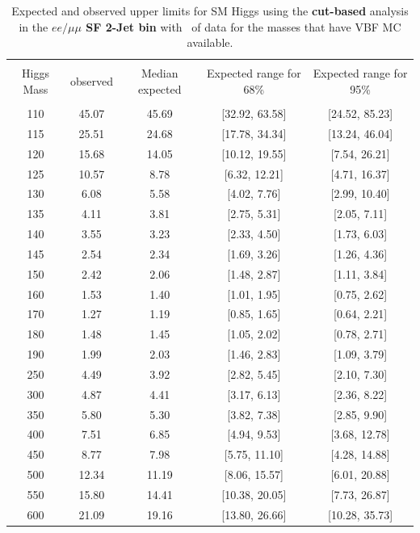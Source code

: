 \begin{table}[hbp!]
\begin{center}
\begin{tabular}{c c c c c}
\hline
\vspace{-3mm} && \\
 Higgs Mass & observed  & Median expected & Expected range for 68\% & Expected range for 95\%   \\
\vspace{-3mm} && \\
\hline
110 & 45.07 & 45.69 & [32.92, 63.58] & [24.52, 85.23] \\
115 & 25.51 & 24.68 & [17.78, 34.34] & [13.24, 46.04] \\
120 & 15.68 & 14.05 & [10.12, 19.55] & [7.54, 26.21] \\
125 & 10.57 & 8.78 & [6.32, 12.21] & [4.71, 16.37] \\
130 & 6.08 & 5.58 & [4.02, 7.76] & [2.99, 10.40] \\
135 & 4.11 & 3.81 & [2.75, 5.31] & [2.05, 7.11] \\
140 & 3.55 & 3.23 & [2.33, 4.50] & [1.73, 6.03] \\
145 & 2.54 & 2.34 & [1.69, 3.26] & [1.26, 4.36] \\
150 & 2.42 & 2.06 & [1.48, 2.87] & [1.11, 3.84] \\
160 & 1.53 & 1.40 & [1.01, 1.95] & [0.75, 2.62] \\
170 & 1.27 & 1.19 & [0.85, 1.65] & [0.64, 2.21] \\
180 & 1.48 & 1.45 & [1.05, 2.02] & [0.78, 2.71] \\
190 & 1.99 & 2.03 & [1.46, 2.83] & [1.09, 3.79] \\

250 & 4.49 & 3.92 & [2.82, 5.45] & [2.10, 7.30] \\
300 & 4.87 & 4.41 & [3.17, 6.13] & [2.36, 8.22] \\
350 & 5.80 & 5.30 & [3.82, 7.38] & [2.85, 9.90] \\
400 & 7.51 & 6.85 & [4.94, 9.53] & [3.68, 12.78] \\
450 & 8.77 & 7.98 & [5.75, 11.10] & [4.28, 14.88] \\
500 & 12.34 & 11.19 & [8.06, 15.57] & [6.01, 20.88] \\
550 & 15.80 & 14.41 & [10.38, 20.05] & [7.73, 26.87] \\
600 & 21.09 & 19.16 & [13.80, 26.66] & [10.28, 35.73] \\
\hline
\end{tabular}
\caption{Expected and observed upper limits for SM Higgs using the
  {\bf cut-based} analysis in the {\bf $ee/\mu\mu$ SF 2-Jet bin} with \intlumiEightTeV\ of data
 for the masses that have VBF MC available. }
\label{tab:cutbase_uls_2jsf}
\end{center}
\end{table}
\clearpage


